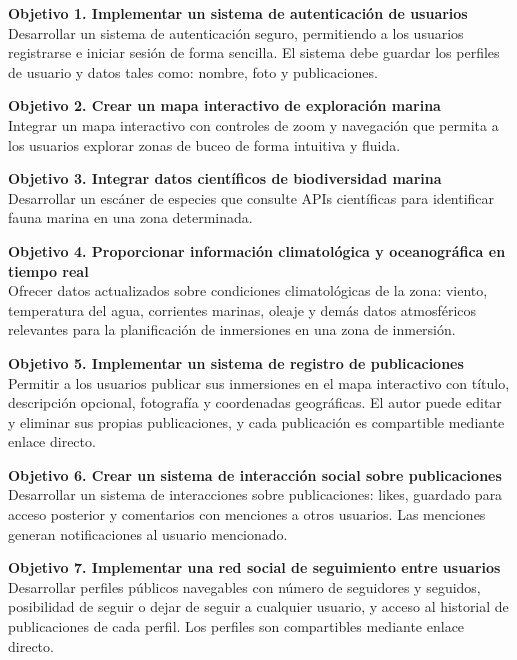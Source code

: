 \begin{description}
\item \textbf{Objetivo 1. Implementar un sistema de autenticación de usuarios} \\
Desarrollar un sistema de autenticación seguro, permitiendo a los usuarios registrarse e iniciar sesión de forma sencilla. El sistema debe guardar los perfiles de usuario y datos tales como: nombre, foto y publicaciones.

\item \textbf{Objetivo 2. Crear un mapa interactivo de exploración marina} \\
Integrar un mapa interactivo con controles de zoom y navegación que permita a los usuarios explorar zonas de buceo de forma intuitiva y fluida.

\item \textbf{Objetivo 3. Integrar datos científicos de biodiversidad marina} \\
Desarrollar un escáner de especies que consulte APIs científicas para identificar fauna marina en una zona determinada. 

\item \textbf{Objetivo 4. Proporcionar información climatológica y oceanográfica en tiempo real} \\
Ofrecer datos actualizados sobre condiciones climatológicas de la zona: viento, temperatura del agua, corrientes marinas, oleaje y demás datos atmosféricos relevantes para la planificación de inmersiones en una zona de inmersión.

\item \textbf{Objetivo 5. Implementar un sistema de registro de publicaciones} \\
Permitir a los usuarios publicar sus inmersiones en el mapa interactivo con título, descripción opcional, fotografía y coordenadas geográficas. El autor puede editar y eliminar sus propias publicaciones, y cada publicación es compartible mediante enlace directo.

\item \textbf{Objetivo 6. Crear un sistema de interacción social sobre publicaciones} \\
Desarrollar un sistema de interacciones sobre publicaciones: likes, guardado para acceso posterior y comentarios con menciones a otros usuarios. Las menciones generan notificaciones al usuario mencionado.

\item \textbf{Objetivo 7. Implementar una red social de seguimiento entre usuarios} \\
Desarrollar perfiles públicos navegables con número de seguidores y seguidos, posibilidad de seguir o dejar de seguir a cualquier usuario, y acceso al historial de publicaciones de cada perfil. Los perfiles son compartibles mediante enlace directo.


\end{description}

